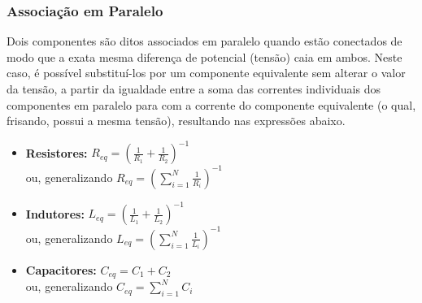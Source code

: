\documentclass{article}
\numberwithin{equation}{section}
\begin{document}
\subsubsection{Associação em Paralelo}
\label{subsubsec:paralelo}
Dois componentes são ditos associados em paralelo quando estão conectados de modo que a exata mesma diferença de potencial (tensão) caia em ambos. Neste caso, é possível substituí-los por um componente equivalente sem alterar o valor da tensão, a partir da igualdade entre a soma das correntes individuais dos componentes em paralelo para com a corrente do componente equivalente (o qual, frisando, possui a mesma tensão), resultando nas expressões abaixo.

\begin{itemize}
    \item \textbf{Resistores:} $R_{eq}= \left(\displaystyle{\frac{1}{R_{1}}} + \displaystyle{\frac{1}{R_{2}}}\right)^{-1}$\\
    ou, generalizando $R_{eq}= \left(\displaystyle{\sum_{i=1}^{N} \frac{1}{R_{i}}}\right)^{-1}$
    \item \textbf{Indutores:} $L_{eq}= \left(\displaystyle{\frac{1}{L_{1}}} + \displaystyle{\frac{1}{L_{2}}}\right)^{-1}$\\
    ou, generalizando $L_{eq}= \left(\displaystyle{\sum_{i=1}^{N} \frac{1}{L_{i}}}\right)^{-1}$
    \item \textbf{Capacitores:} $C_{eq}= C_{1} + C_{2} $\\
    ou, generalizando $C_{eq}= \displaystyle{\sum_{i=1}^{N} C_{i}}$
\end{itemize}
\end{document}
